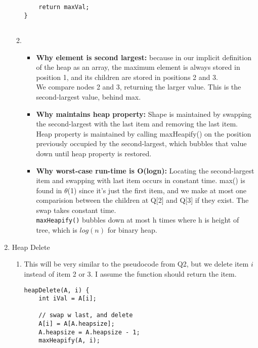 \documentclass{article}
\begin{document}
\begin{enumerate}
\begin{enumerate}
\begin{lstlisting}
	return maxVal;
}
    		
    	\end{lstlisting}
    	
    	\item 
    	\begin{itemize}
    		\item \textbf{Why element is second largest:} because in our implicit definition of the heap as an array, the maximum element is always stored in position 1, and its children are stored in positions 2 and 3. \\
    		
    		We compare nodes 2 and 3, returning the larger value. This is the second-largest value, behind max. \\
    		\item \textbf{Why maintains heap property:} Shape is maintained by swapping the second-largest with the last item and removing the last item. Heap property is maintained by calling maxHeapify() on the position previously occupied by the second-largest, which bubbles that value down until heap property is restored. \\
    		\item \textbf{Why worst-case run-time is O(logn):} Locating the second-largest item and swapping with last item occurs in constant time. max() is found in $\theta$(1) since it's just the first item, and we make at most one comparision between the children at Q[2] and Q[3] if they exist. The swap takes constant time. \\
    		
    		 \texttt{maxHeapify()} bubbles down at most h times where h is height of tree, which is $log(n)$ for binary heap. \\
    	\end{itemize}
    	
	\end{enumerate}
	
	\item Heap Delete
	
	\begin{enumerate}
		\item This will be very similar to the pseudocode from Q2, but we delete item $i$ instead of item 2 or 3. I assume the function should return the item.
		\begin{lstlisting}
heapDelete(A, i) {	
	int iVal = A[i];	
	
	// swap w last, and delete	
	A[i] = A[A.heapsize];
	A.heapsize = A.heapsize - 1;
	maxHeapify(A, i);
	

\end{lstlisting}
\end{enumerate}
\end{enumerate}
\end{document}
